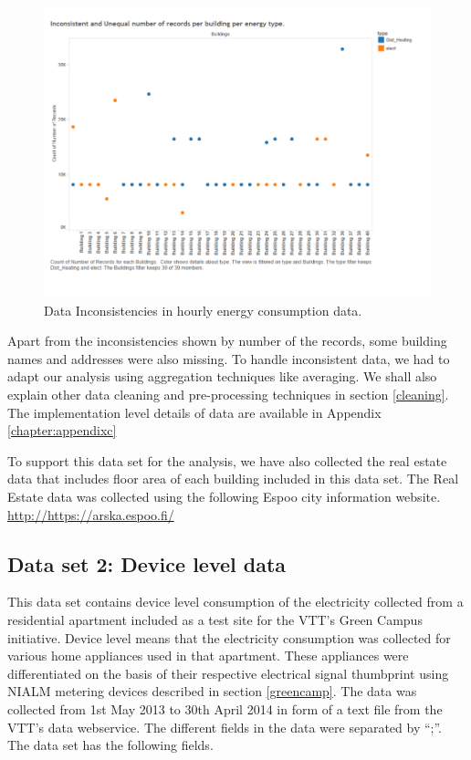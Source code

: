 \begin{figure}[!ht]
    \begin{center}
      \includegraphics[width=\textwidth]{images/incon.pdf}
      \caption{Data Inconsistencies in hourly energy consumption data.}
      \label{fig:incon}
    \end{center}
  \end{figure} 
Apart from the inconsistencies shown by number of the records, some building names and addresses were also missing. To handle inconsistent data, we had to adapt our analysis using aggregation techniques like averaging. We shall also explain other data cleaning and pre-processing techniques in section \ref{cleaning}. The implementation level details of data are available in Appendix \ref{chapter:appendixc}

To support this data set for the analysis, we have also collected the real estate data that includes floor area of each building included in this data set. The Real Estate data was collected using the following Espoo city information website.
\url{http://https://arska.espoo.fi/}


\subsection{Data set 2: Device level data} \label{nialmset}
This data set contains device level consumption of the electricity collected from a residential apartment included as a test site for the VTT's Green Campus initiative. Device level means that the electricity consumption was collected for various home appliances used in that apartment. These appliances were differentiated on the basis of their respective electrical signal thumbprint using NIALM metering devices described in section \ref{greencamp}. The data was collected from 1st May 2013 to 30th April 2014 in form of a text file from the VTT's data webservice. The different fields in the data were separated by ``;''. The data set has the following fields.

